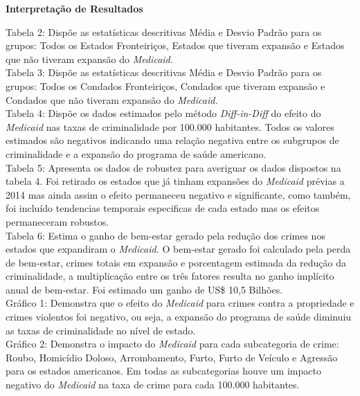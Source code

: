 \documentclass[12pt]{article}
\begin{document}
\vspace*{1cm}
\textbf{Interpretação de Resultados}

Tabela 2: Dispõe as estatísticas descritivas Média e Desvio Padrão para
os grupos: Todos os Estados Fronteiriços, Estados que tiveram expansão e
Estados que não tiveram expansão do \emph{Medicaid.}\\


Tabela 3: Dispõe as estatísticas descritivas Média e Desvio Padrão para
os grupos: Todos os Condados Fronteiriços, Condados que tiveram expansão
e Condados que não tiveram expansão do \emph{Medicaid.}\\


Tabela 4: Dispõe os dados estimados pelo método \emph{Diff-in-Diff} do
efeito do \emph{Medicaid} nas taxas de criminalidade por 100.000
habitantes. Todos os valores estimados são negativos indicando uma
relação negativa entre os subgrupos de criminalidade e a expansão do
programa de saúde americano.\\


Tabela 5: Apresenta os dados de robustez para averiguar os dados
dispostos na tabela 4. Foi retirado os estados que já tinham expansões
do \emph{Medicaid} prévias a 2014 mas ainda assim o efeito permaneceu
negativo e significante, como também, foi incluído tendencias temporais
especificas de cada estado mas os efeitos permaneceram robustos.\\


Tabela 6: Estima o ganho de bem-estar gerado pela redução dos crimes nos
estados que expandiram o \emph{Medicaid.} O bem-estar gerado foi
calculado pela perda de bem-estar, crimes totais em expansão e
porcentagem estimada da redução da criminalidade, a multiplicação entre
os três fatores resulta no ganho implícito anual de bem-estar. Foi
estimado um ganho de US\$ 10,5 Bilhões.\\


Gráfico 1: Demonstra que o efeito do \emph{Medicaid} para crimes contra
a propriedade e crimes violentos foi negativo, ou seja, a expansão do
programa de saúde diminuiu as taxas de criminalidade no nível de estado.\\


Gráfico 2: Demonstra o impacto do \emph{Medicaid} para cada subcategoria
de crime: Roubo, Homicídio Doloso, Arrombamento, Furto, Furto de Veículo
e Agressão para os estados americanos. Em todas as subcategorias houve
um impacto negativo do \emph{Medicaid} na taxa de crime para cada
100.000 habitantes.\\
\end{document}
